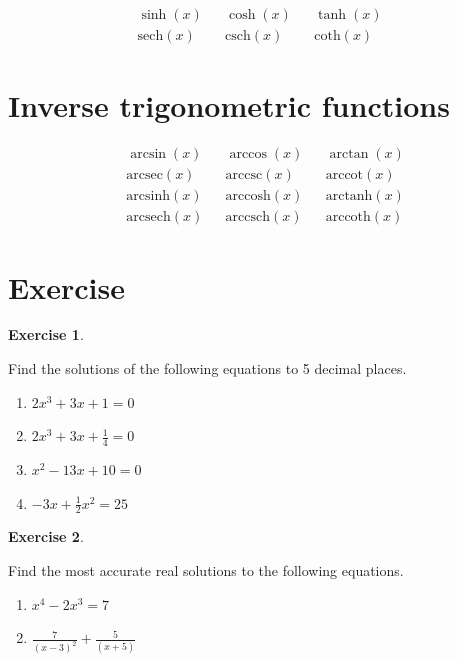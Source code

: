 \documentclass[
]{book}
\providecommand{\tightlist}{%
  \setlength{\itemsep}{0pt}\setlength{\parskip}{0pt}}
\theoremstyle{definition}
\theoremstyle{definition}
\theoremstyle{definition}
\newtheorem{exercise}{Exercise}[chapter]
\theoremstyle{definition}
\theoremstyle{remark}
\begin{document}
\[
\begin{aligned}
 \sinh(x) && \cosh(x) && \tanh(x) \\
 \text{sech}(x) &&  \text{csch}(x) && \text{coth}(x) 
\end{aligned}
\]

\section{Inverse trigonometric functions}\label{inverse-trigonometric-functions}

\[
\begin{aligned}
 &\arcsin(x)        && \arccos(x)  && \arctan(x)\\
 &\text{arcsec}(x)  && \text{arccsc}(x)  && \text{arccot}(x)\\
 &\text{arcsinh}(x) && \text{arccosh}(x) && \text{arctanh}(x)\\
 &\text{arcsech}(x) && \text{arccsch}(x) && \text{arccoth}(x)
\end{aligned}
\]

\section{Exercise}\label{exercise-4}

\begin{exercise}
\protect\hypertarget{exr:unnamed-chunk-18}{}\label{exr:unnamed-chunk-18}

Find the solutions of the following equations to 5 decimal places.

\begin{enumerate}
\def\labelenumi{\roman{enumi}.}
\tightlist
\item
  \(2x^3 + 3x + 1 = 0\)
\item
  \(2x^3 + 3x + \frac{1}{4} = 0\)
\item
  \(x^2 - 13x + 10 = 0\)
\item
  \(-3x + \frac{1}{2}x^2 = 25\)
\end{enumerate}

\end{exercise}

\begin{exercise}
\protect\hypertarget{exr:unnamed-chunk-19}{}\label{exr:unnamed-chunk-19}

Find the most accurate real solutions to the following equations.

\begin{enumerate}
\def\labelenumi{\roman{enumi}.}
\tightlist
\item
  \(x^4 - 2x^3 = 7\)
\item
  \(\frac{7}{(x-3)^2} + \frac{5}{(x+5)}\)
\end{enumerate}

\end{exercise}
\end{document}
